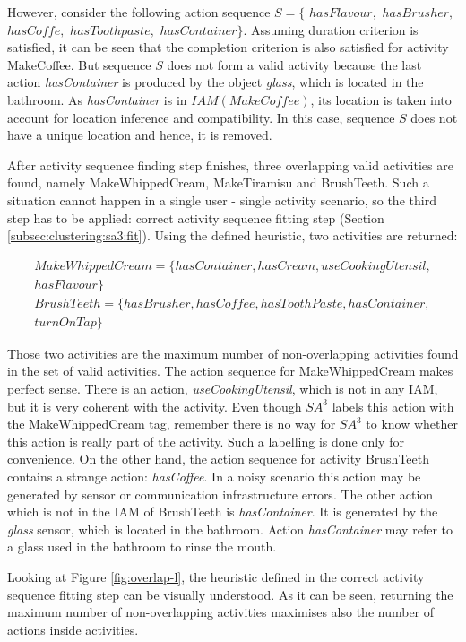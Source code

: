 However, consider the following action sequence $S = \{$ $hasFlavour,$ $hasBrusher,$ $hasCoffe,$ $hasToothpaste,$ $hasContainer\}$. Assuming duration criterion is satisfied, it can be seen that the completion criterion is also satisfied for activity MakeCoffee. But sequence $S$ does not form a valid activity because the last action \textit{hasContainer} is produced by the object \textit{glass}, which is located in the bathroom. As \textit{hasContainer} is in $IAM(MakeCoffee)$, its location is taken into account for location inference and compatibility. In this case, sequence $S$ does not have a unique location and hence, it is removed. 

After activity sequence finding step finishes, three overlapping valid activities are found, namely MakeWhippedCream, MakeTiramisu and BrushTeeth. Such a situation cannot happen in a single user - single activity scenario, so the third step has to be applied: correct activity sequence fitting step (Section \ref{subsec:clustering:sa3:fit}). Using the defined heuristic, two activities are returned:

\begin{equation*}
  \begin{split}   
  MakeWhippedCream = \{hasContainer, hasCream, useCookingUtensil,\\ 
  hasFlavour\} \\
  BrushTeeth = \{hasBrusher, hasCoffee, hasToothPaste, hasContainer,\\ 
  turnOnTap\} 
  \end{split}
 \end{equation*} 

Those two activities are the maximum number of non-overlapping activities found in the set of valid activities. The action sequence for MakeWhippedCream makes perfect sense. There is an action, \textit{useCookingUtensil}, which is not in any IAM, but it is very coherent with the activity. Even though $SA^3$ labels this action with the MakeWhippedCream tag, remember there is no way for $SA^3$ to know whether this action is really part of the activity. Such a labelling is done only for convenience. On the other hand, the action sequence for activity BrushTeeth contains a strange action: \textit{hasCoffee}. In a noisy scenario this action may be generated by sensor or communication infrastructure errors. The other action which is not in the IAM of BrushTeeth is \textit{hasContainer}. It is generated by the \textit{glass} sensor, which is located in the bathroom. Action \textit{hasContainer} may refer to a glass used in the bathroom to rinse the mouth. 

Looking at Figure \ref{fig:overlap-l}, the heuristic defined in the correct activity sequence fitting step can be visually understood. As it can be seen, returning the maximum number of non-overlapping activities maximises also the number of actions inside activities.